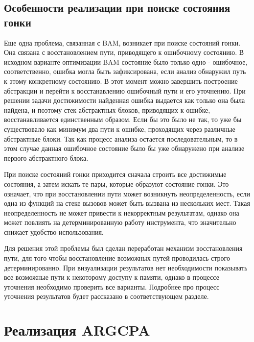 \subsection{Особенности реализации при поиске состояния гонки}

Еще одна проблема, связанная с BAM, возникает при поиске состояний гонки. Она связана с  восстановлением пути, приводящего к ошибочному состоянию.
В исходном варианте оптимизации BAM состояние было только одно - ошибочное, соответственно, ошибка могла быть зафиксирована, если анализ обнаружил путь к этому конкретному состоянию.
В этот момент можно завершить построение абстракции и перейти к восстанавлению ошибочный пути и его уточнению.
При решении задачи достижимости найденная ошибка выдается как только она была найдена, и поэтому стек абстрактных блоков, приводящих к ошибке, восстанавливается единственным образом.
Если бы это было не так, то уже бы существовало как минимум два пути к ошибке, проходящих через различные абстрактные блоки.
Так как процесс анализа остается последовательным, то в этом случае данная ошибочное состояние было бы уже обнаружено при анализе первого абстрактного блока. 

При поиске состояний гонки приходится сначала строить все достижимые состояния, а затем искать те пары, которые образуют состояние гонки.
Это означает, что при восстановлении пути может возникнуть неопределенность, если одна из функций на стеке вызовов может быть вызвана из нескольких мест.
Такая неопределенность не может привести к некорректным результатам, однако она может повлиять на детерминированную работу инструмента, что значительно снижает удобство использования.

Для решения этой проблемы был сделан переработан механизм восстановления пути, для того чтобы восстановление возможных путей проводилась строго детерминированно.
При визуализации результатов нет необходимости показывать все возможные пути к некоторому доступу к памяти, однако в процессе уточнения необходимо проверить все варианты.
Подробнее про процесс уточнения результатов будет рассказано в соответствующем разделе.

\section{Реализация ARGCPA}
\label{sect_impl_arg}

